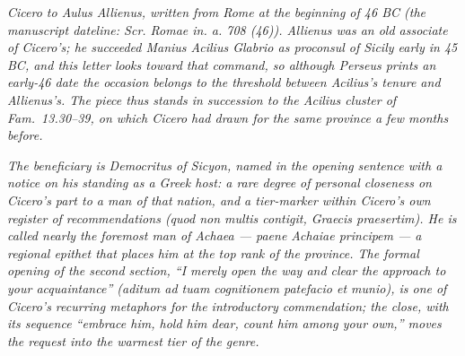 
\textit{Cicero to Aulus Allienus, written from Rome at the
beginning of 46 BC (the manuscript dateline:
\textit{Scr. Romae in. a. 708 (46)}). Allienus was an
old associate of Cicero's; he succeeded Manius Acilius
Glabrio as proconsul of Sicily early in 45 BC, and this
letter looks toward that command, so although Perseus
prints an early-46 date the occasion belongs to the
threshold between Acilius's tenure and Allienus's. The
piece thus stands in succession to the Acilius cluster
of Fam.\ 13.30--39, on which Cicero had drawn for the
same province a few months before.}

\textit{The beneficiary is Democritus of Sicyon, named in
the opening sentence with a notice on his standing as a
Greek host: a rare degree of personal closeness on
Cicero's part to a man of that nation, and a tier-marker
within Cicero's own register of recommendations
(\textit{quod non multis contigit, Graecis praesertim}).
He is called nearly the foremost man of Achaea ---
\textit{paene Achaiae principem} --- a regional epithet
that places him at the top rank of the province. The
formal opening of the second section, ``I merely open the
way and clear the approach to your acquaintance''
(\textit{aditum ad tuam cognitionem patefacio et munio}),
is one of Cicero's recurring metaphors for the
introductory commendation; the close, with its
sequence ``embrace him, hold him dear, count him among
your own,'' moves the request into the warmest tier
of the genre.}
